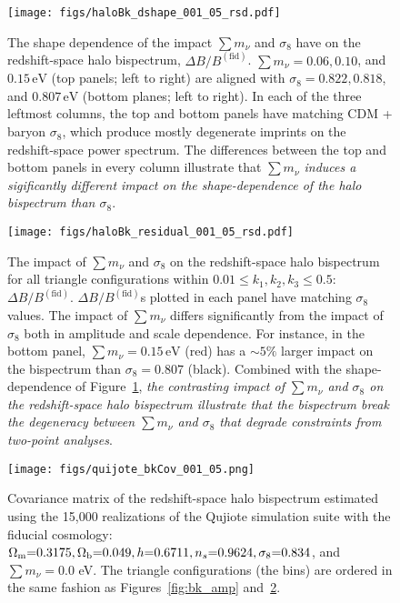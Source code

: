 \documentclass[12pt, letterpaper, preprint]{aastex62}
\newcommand{\Om}{\Omega_{\rm m}}
\newcommand{\Ob}{\Omega_{\rm b}}
\newcommand{\smnu}{\sum m_\nu}
\newcommand{\sig}{\sigma_8}
\begin{document}
\begin{figure}
\begin{center}
\texttt{[image: figs/haloBk\_dshape\_001\_05\_rsd.pdf]} 
    \caption{The shape dependence of the impact $\smnu$ and $\sig$ have on
    the redshift-space halo bispectrum, $\Delta B/B^\mathrm{(fid)}$. 
    $\smnu = 0.06, 0.10$, and $0.15\,\mathrm{eV}$ (top panels; left to right) 
    are aligned with $\sig = 0.822, 0.818$, and $0.807\,\mathrm{eV}$ 
    (bottom planes; left to right). In each of the three leftmost columns,
    the top and bottom panels have matching CDM + baryon $\sig$, which produce 
    mostly degenerate imprints on the redshift-space power spectrum. The 
    differences between the top and bottom panels in every column illustrate 
    that {\em $\smnu$ induces a sigificantly different impact on the shape-dependence 
    of the halo bispectrum than $\sig$}. 
    }
\label{fig:dbk_shape}
\end{center}
\end{figure}


\begin{figure}
\begin{center}
\texttt{[image: figs/haloBk\_residual\_001\_05\_rsd.pdf]}
    \caption{The impact of $\smnu$ and $\sig$ on the redshift-space 
    halo bispectrum for all triangle configurations within $0.01 \leq k_1, k_2, k_3 \leq 0.5$: 
    $\Delta B/B^\mathrm{(fid)}$. $\Delta B/B^\mathrm{(fid)}$s plotted in each panel 
    have matching $\sig$ values. The impact of $\smnu$ differs significantly from the 
    impact of $\sig$ both in amplitude and scale dependence. For instance, in the 
    bottom panel, $\smnu = 0.15\,\mathrm{eV}$ (red) has a $\sim 5\%$ larger impact 
    on the bispectrum than $\sig = 0.807$ (black). Combined with the shape-dependence 
    of Figure~\ref{fig:dbk_shape}, {\em the contrasting impact of $\smnu$ and $\sig$ 
    on the redshift-space halo bispectrum illustrate that the bispectrum break the 
    degeneracy between $\smnu$ and $\sig$ that degrade constraints from two-point 
    analyses}. 
    }
\label{fig:dbk_amp}
\end{center}
\end{figure}

\begin{figure}
\begin{center}
    \texttt{[image: figs/quijote\_bkCov\_001\_05.png]} 
    \caption{Covariance matrix of the redshift-space halo bispectrum estimated 
    using the 15,000 realizations of the Qujiote simulation suite with the 
    fiducial cosmology: $\Om{=}0.3175, \Ob{=}0.049, h{=}0.6711, n_s{=}0.9624, \sig{=}0.834$, 
    and $\smnu{=}0.0$ eV. The triangle configurations (the bins) are ordered in 
    the same fashion as Figures~\ref{fig:bk_amp} and~\ref{fig:dbk_amp}.
    }
\label{fig:bk_cov}
\end{center}
\end{figure}
\end{document}
